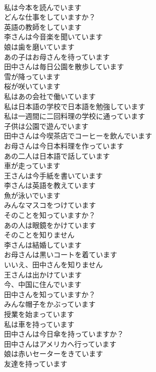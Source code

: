 \documentclass[8pt]{extreport}
\begin{document}
\begin{CJK}{UTF8}{min}
\\	私は今本を読んでいます	
\\	どんな仕事をしていますか？	
\\	英語の教師をしています	
\\	李さんは今音楽を聞いています	
\\	娘は歯を磨いています	
\\	あの子はお母さんを待っています	
\\	田中さんは毎日公園を散歩しています	
\\	雪が降っています	
\\	桜が咲いています	
\\	私はあの会社で働いています	
\\	私は日本語の学校で日本語を勉強しています	
\\	私は一週間に二回料理の学校に通っています	
\\	子供は公園で遊んでいます	
\\	田中さんは今喫茶店でコーヒーを飲んでいます	
\\	お母さんは今日本料理を作っています	
\\	あの二人は日本語で話しています	
\\	車が走っています	
\\	王さんは今手紙を書いています	
\\	李さんは英語を教えています	
\\	魚が泳いでいます	
\\	みんなマスコをつけています	
\\	そのことを知っていますか？	
\\	あの人は眼鏡をかけています	
\\	そのことを知りません	
\\	李さんは結婚しています	
\\	お母さんは黒いコートを着ています	
\\	いいえ、田中さんを知りません	
\\	王さんは出かけています	
\\	今、中国に住んでいます	
\\	田中さんを知っていますか？	
\\	みんな帽子をかぶっています	
\\	授業を始まっています	
\\	私は車を持っています	
\\	田中さんは今日傘を持っていますか？	
\\	田中さんはアメリカへ行っています	
\\	娘は赤いセーターをきています	
\\	友達を持っています	

\end{CJK}
\end{document}
